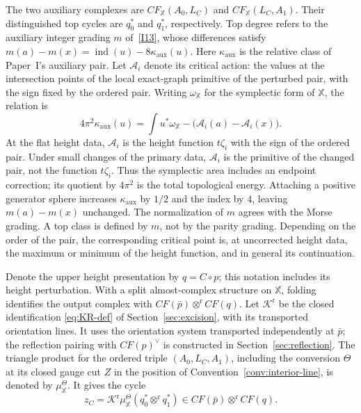 \documentclass[11pt]{amsart}
\theoremstyle{definition}
\theoremstyle{remark}
\theoremstyle{plain}
\numberwithin{equation}{section}
\newcommand{\CF}{\mathit{CF}}
\newcommand{\ind}{\operatorname{ind}}
\begin{document}
The two auxiliary complexes are
$\CF_{\mathbb X}(A_0,L_C)$ and $\CF_{\mathbb X}(L_C,A_1)$. Their
distinguished top cycles are $q_0^*$ and $q_1^*$, respectively. Top
degree refers to the auxiliary integer grading $m$ of~\ref{I13},
whose differences satisfy
$m(a)-m(x)=\ind(u)-8\kappa_{\mathrm{aux}}(u)$.
Here $\kappa_{\mathrm{aux}}$ is the relative class of Paper~I's
auxiliary pair. Let $\mathcal A_i$ denote its critical action: the
values at the intersection points of the local exact-graph primitive
of the perturbed pair, with the sign fixed by the ordered pair.
Writing $\omega_{\mathbb X}$ for the symplectic form of $\mathbb X$,
the relation is
\[
4\pi^2\kappa_{\mathrm{aux}}(u)
 =\int u^*\omega_{\mathbb X}-\bigl(\mathcal A_i(a)-\mathcal A_i(x)\bigr).
\]
At the flat height data, $\mathcal A_i$ is the height function
$t\zeta_i$ with the sign of the ordered pair. Under small changes of
the primary data, $\mathcal A_i$ is the primitive of the changed pair,
not the function $t\zeta_i$. Thus the symplectic area includes an
endpoint correction; its quotient by $4\pi^2$ is the total
topological energy. Attaching a positive generator sphere increases
$\kappa_{\mathrm{aux}}$ by $1/2$ and the index by $4$, leaving
$m(a)-m(x)$ unchanged. The normalization of $m$ agrees with the Morse
grading. A top class is defined by $m$, not by the parity grading.
Depending on the order of the pair, the corresponding critical point
is, at uncorrected height data, the maximum or minimum of the height function, and in general
its continuation.

Denote the upper height presentation by $q=C\circ p$; this notation
includes its height perturbation. With a split almost-complex
structure on $\mathbb X$, folding identifies the output complex with
$\CF(\bar p)\otimes^{\mathrm r}\CF(q)$. Let $\mathcal K^{\mathrm r}$ be the closed
identification \eqref{eq:KR-def} of Section~\ref{sec:excision}, with
its transported orientation lines. It uses the orientation system
transported independently at $\bar p$; the reflection pairing with
$\CF(p)^\vee$ is constructed in Section~\ref{sec:reflection}. The
triangle product for the ordered triple $(A_0,L_C,A_1)$, including
the conversion $\Theta$ at its closed gauge cut $Z$ in the position of
Convention~\ref{conv:interior-line}, is denoted by
$\mu_{\mathbb X}^\Theta$. It gives the cycle
\begin{equation}\label{eq:cup-tensor}
 z_C=\mathcal K^{\mathrm r}\mu_{\mathbb X}^\Theta(q_0^*\otimes^{\mathrm r} q_1^*)
       \in\CF(\bar p)\otimes^{\mathrm r}\CF(q).
\end{equation}
\end{document}
